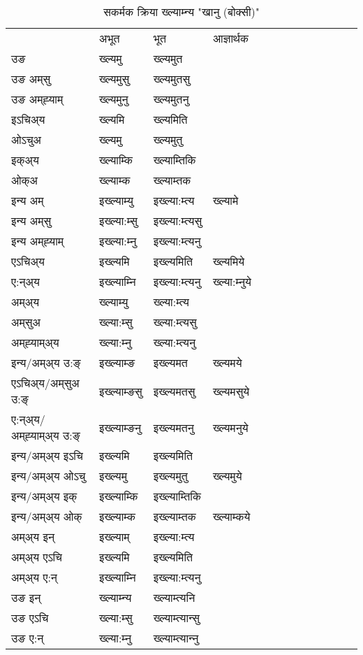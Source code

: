 \begin{table}[H]
\centering
\caption{\label{ɛm.vt} सकर्मक क्रिया  ख्ल्याम्‍न्य  "खानु (बोक्सी)"  }
\begin{tabular}{l|l|l|l|l|l|l|l|l|l|l|l|l}  \toprule
&अभूत & भूत & आज्ञार्थक \\ 
उङ &ख्ल्यमु &ख्ल्यमुत \\ 
उङ अम्‌सु &ख्ल्यमुसु &ख्ल्यमुतसु \\ 
उङ अम्‌ह्‍याम् &ख्ल्यमुनु &ख्ल्यमुतनु \\ 
इऽचिअ्य &ख्ल्यमि &ख्ल्यमिति   \\ 
ओऽचुअ &ख्ल्यमु &ख्ल्यमुतु   \\ 
इक्अ्य &ख्ल्याम्कि &ख्ल्याम्तिकि   \\ 
ओक्अ &ख्ल्याम्क &ख्ल्याम्तक   \\ 
इन्य अम् & इख्ल्याम्यु  & इख्ल्या:म्त्य &ख्ल्यामे  \\ 
इन्य अम्‌सु & इख्ल्या:म्सु  & इख्ल्या:म्त्यसु   \\ 
इन्य अम्‌ह्‍याम् & इख्ल्या:म्‍नु  & इख्ल्या:म्त्यनु   \\ 
एऽचिअ्य & इख्ल्यमि & इख्ल्यमिति &ख्ल्यमिये    \\ 
ए:न्अ्य & इख्ल्याम्‍नि  & इख्ल्या:म्त्यनु &ख्ल्या:म्‍नुये  \\ 
अम्अ्य & ख्ल्याम्यु  & ख्ल्या:म्त्य  \\ 
अम्‌सुअ & ख्ल्या:म्सु & ख्ल्या:म्त्यसु  \\ 
अम्‌ह्‍याम्अ्य & ख्ल्या:म्‍नु  & ख्ल्या:म्त्यनु \\ 
\midrule
इन्य/अम्अ्य उ:ङ्‌&इख्ल्याम्ङ & इख्ल्यमत &ख्ल्यमये \\ 
एऽचिअ्य/अम्‌सुअ उ:ङ्‌ &इख्ल्याम्ङसु & इख्ल्यमतसु &ख्ल्यमसुये \\ 
ए:न्अ्य/अम्‌ह्‍याम्अ्य उ:ङ्‌ &इख्ल्याम्ङनु & इख्ल्यमतनु &ख्ल्यमनुये \\ 
इन्य/अम्अ्य इऽचि & इख्ल्यमि & इख्ल्यमिति    \\ 
इन्य/अम्अ्य ओऽचु & इख्ल्यमु & इख्ल्यमुतु  &ख्ल्यमुये  \\ 
इन्य/अम्अ्य इक् & इख्ल्याम्कि & इख्ल्याम्तिकि   \\ 
इन्य/अम्अ्य ओक् & इख्ल्याम्क & इख्ल्याम्तक  &ख्ल्याम्कये  \\ 
अम्अ्य इन् & इख्ल्याम् & इख्ल्या:म्त्य   \\ 
अम्अ्य एऽचि & इख्ल्यमि & इख्ल्यमिति    \\ 
अम्अ्य ए:न् & इख्ल्याम्‍नि  & इख्ल्या:म्त्यनु  \\ 
\midrule
उङ इन् & ख्ल्याम्‍न्य  & ख्ल्याम्त्यनि  \\ 
उङ एऽचि & ख्ल्या:म्सु  & ख्ल्याम्त्यान्सु   \\ 
उङ ए:न्& ख्ल्या:म्‍नु  & ख्ल्याम्त्यान्‍नु   \\ 
\bottomrule
\end{tabular}
\end{table}


